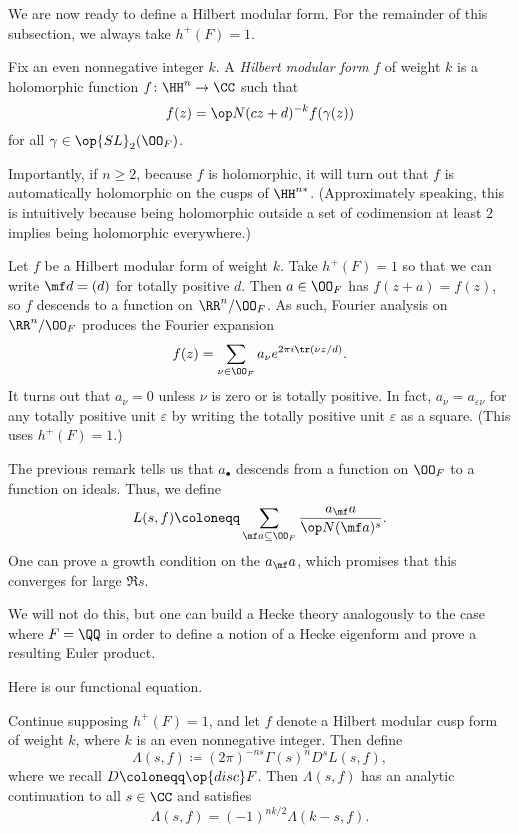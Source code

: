 \documentclass{article}
\begin{document}
We are now ready to define a Hilbert modular form. For the remainder of this subsection, we always take $h^+(F)=1$.
\begin{definition}
	Fix an even nonnegative integer $k$. A \textit{Hilbert modular form} $f$ of weight $k$ is a holomorphic function $f\colon\HH^n\to\CC$ such that
	\[f(z)=\op N(cz+d)^{-k}f(\gamma(z))\]
	for all $\gamma\in\op{SL}_2(\OO_F)$.
\end{definition}
Importantly, if $n\ge2$, because $f$ is holomorphic, it will turn out that $f$ is automatically holomorphic on the cusps of $\HH^{n*}$. (Approximately speaking, this is intuitively because being holomorphic outside a set of codimension at least $2$ implies being holomorphic everywhere.)
\begin{remark}
	Let $f$ be a Hilbert modular form of weight $k$. Take $h^+(F)=1$ so that we can write $\mf d=(d)$ for totally positive $d$. Then $a\in\OO_F$ has $f(z+a)=f(z)$, so $f$ descends to a function on $\RR^n/\OO_F$. As such, Fourier analysis on $\RR^n/\OO_F$ produces the Fourier expansion
	\[f(z)=\sum_{\nu\in\OO_F}a_\nu e^{2\pi i\tr(\nu z/d)}.\]
	It turns out that $a_\nu=0$ unless $\nu$ is zero or is totally positive. In fact, $a_\nu=a_{\varepsilon\nu}$ for any totally positive unit $\varepsilon$ by writing the totally positive unit $\varepsilon$ as a square. (This uses $h^+(F)=1$.)
\end{remark}
The previous remark tells us that $a_\bullet$ descends from a function on $\OO_F$ to a function on ideals. Thus, we define
\[L(s,f)\coloneqq\sum_{\mf a\subseteq\OO_F}\frac{a_\mf a}{\op N(\mf a)^s}.\]
One can prove a growth condition on the $a_\mf a$, which promises that this converges for large $\Re s$.
\begin{remark}
	We will not do this, but one can build a Hecke theory analogously to the case where $F=\QQ$ in order to define a notion of a Hecke eigenform and prove a resulting Euler product.
\end{remark}
Here is our functional equation.
\begin{theorem} \label{thm:hilbert-functional-equation}
	Continue supposing $h^+(F)=1$, and let $f$ denote a Hilbert modular cusp form of weight $k$, where $k$ is an even nonnegative integer. Then define
	\[\Lambda(s,f)\coloneqq(2\pi)^{-ns}\Gamma(s)^nD^sL(s,f),\]
	where we recall $D\coloneqq\op{disc}F$. Then $\Lambda(s,f)$ has an analytic continuation to all $s\in\CC$ and satisfies
	\[\Lambda(s,f)=(-1)^{nk/2}\Lambda(k-s,f).\]
\end{theorem}
\end{document}
